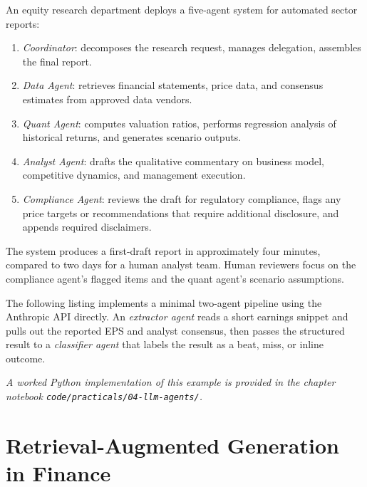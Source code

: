 \begin{deepdive}
\begin{example}
\label{ex:multi-agent-research}
An equity research department deploys a five-agent system for automated sector reports:
\begin{enumerate}
  \item \textit{Coordinator}: decomposes the research request, manages delegation,
        assembles the final report.
  \item \textit{Data Agent}: retrieves financial statements, price data, and consensus
        estimates from approved data vendors.
  \item \textit{Quant Agent}: computes valuation ratios, performs regression analysis
        of historical returns, and generates scenario outputs.
  \item \textit{Analyst Agent}: drafts the qualitative commentary on business model,
        competitive dynamics, and management execution.
  \item \textit{Compliance Agent}: reviews the draft for regulatory compliance, flags
        any price targets or recommendations that require additional disclosure, and
        appends required disclaimers.
\end{enumerate}
The system produces a first-draft report in approximately four minutes, compared to
two days for a human analyst team. Human reviewers focus on the compliance agent's
flagged items and the quant agent's scenario assumptions.
\end{example}

The following listing implements a minimal two-agent pipeline using the Anthropic API
directly. An \emph{extractor agent} reads a short earnings snippet and pulls out the
reported EPS and analyst consensus, then passes the structured result to a
\emph{classifier agent} that labels the result as a beat, miss, or inline outcome.

\textit{A worked Python implementation of this example is provided in the chapter notebook \texttt{code/practicals/04-llm-agents/}.}

\end{deepdive}


\section{Retrieval-Augmented Generation in Finance}
\label{sec:rag-finance}

